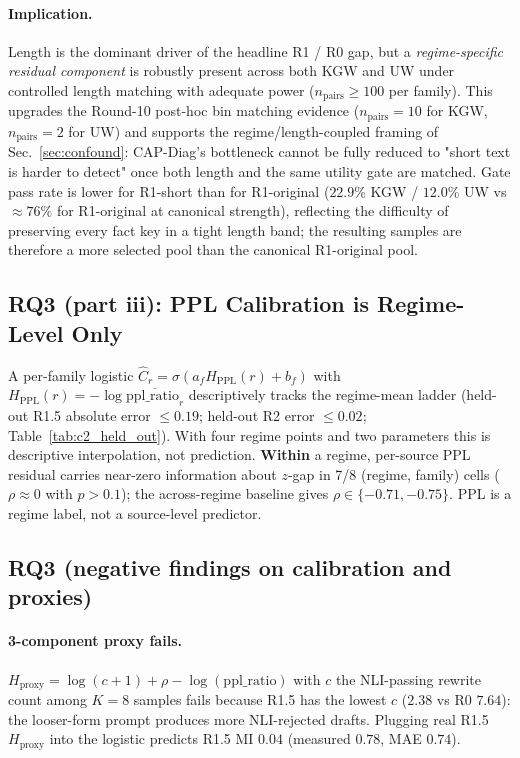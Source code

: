 \documentclass[11pt]{article}
\begin{document}
\paragraph{Implication.}
Length is the dominant driver of the headline R1 / R0 gap, but a
\emph{regime-specific residual component} is robustly present across both
KGW and UW under controlled length matching with adequate power
($n_{\mathrm{pairs}} \geq 100$ per family). This upgrades the Round-10
post-hoc bin matching evidence ($n_{\mathrm{pairs}}{=}10$ for KGW,
$n_{\mathrm{pairs}}{=}2$ for UW) and supports the regime/length-coupled
framing of Sec.~\ref{sec:confound}: CAP-Diag's bottleneck cannot be
fully reduced to "short text is harder to detect" once both length and
the same utility gate are matched. Gate pass rate is lower for R1-short
than for R1-original ($22.9\%$ KGW / $12.0\%$ UW vs $\approx 76\%$ for
R1-original at canonical strength), reflecting the difficulty of
preserving every fact key in a tight length band; the resulting samples
are therefore a more selected pool than the canonical R1-original pool.

\subsection{RQ3 (part iii): PPL Calibration is Regime-Level Only}
\label{sec:c2}

A per-family logistic $\hat C_r=\sigma(a_f H_{\mathrm{PPL}}(r)+b_f)$ with
$H_{\mathrm{PPL}}(r)=-\log\overline{\mathrm{ppl\_ratio}_r}$ descriptively
tracks the regime-mean ladder (held-out R1.5 absolute error $\leq 0.19$;
held-out R2 error $\leq 0.02$; Table~\ref{tab:c2_held_out}). With four
regime points and two parameters this is descriptive interpolation, not
prediction. \textbf{Within} a regime, per-source PPL residual carries
near-zero information about $z$-gap in 7/8 (regime, family) cells
($\rho \approx 0$ with $p>0.1$); the across-regime baseline gives
$\rho\in\{-0.71,-0.75\}$. PPL is a regime label, not a source-level
predictor.



\subsection{RQ3 (negative findings on calibration and proxies)}
\label{sec:negative}

\paragraph{3-component proxy fails.}
$H_{\mathrm{proxy}}=\log(c{+}1)+\rho-\log(\mathrm{ppl\_ratio})$ with $c$
the NLI-passing rewrite count among $K{=}8$ samples fails because R1.5 has
the lowest $c$ ($2.38$ vs R0 $7.64$): the looser-form prompt produces more
NLI-rejected drafts. Plugging real R1.5 $H_\text{proxy}$ into the logistic
predicts R1.5 MI $0.04$ (measured $0.78$, MAE $0.74$).
\end{document}
